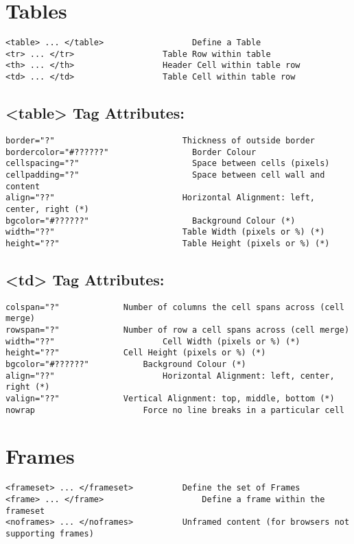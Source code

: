 \documentclass[11pt]{article}
\begin{document}
\section*{Tables}
\label{sec:org1fbd192}
\begin{verbatim}
<table> ... </table>                  Define a Table
<tr> ... </tr>	                Table Row within table
<th> ... </th>	                Header Cell within table row
<td> ... </td>	                Table Cell within table row
\end{verbatim}
\subsection*{<table> Tag Attributes:}
\label{sec:org8ea0368}
\begin{verbatim}
border="?"	                        Thickness of outside border
bordercolor="#??????"                 Border Colour
cellspacing="?"                       Space between cells (pixels)
cellpadding="?"                       Space between cell wall and content
align="??"	                        Horizontal Alignment: left, center, right (*)
bgcolor="#??????"                     Background Colour (*)
width="??"	                        Table Width (pixels or %) (*)
height="??"	                        Table Height (pixels or %) (*)
\end{verbatim}
\subsection*{<td> Tag Attributes:}
\label{sec:orge19ff92}
\begin{verbatim}
colspan="?"		        Number of columns the cell spans across (cell merge)
rowspan="?"		        Number of row a cell spans across (cell merge)
width="??"	        	        Cell Width (pixels or %) (*)
height="??"		        Cell Height (pixels or %) (*)
bgcolor="#??????"  	        Background Colour (*)
align="??"	        	        Horizontal Alignment: left, center, right (*)
valign="??"		        Vertical Alignment: top, middle, bottom (*)
nowrap		                Force no line breaks in a particular cell
\end{verbatim}
\section*{Frames}
\label{sec:org35b7423}
\begin{verbatim}
<frameset> ... </frameset>	        Define the set of Frames
<frame> ... </frame>	                Define a frame within the frameset
<noframes> ... </noframes>	        Unframed content (for browsers not supporting frames)
\end{verbatim}
\end{document}
